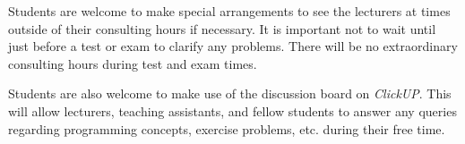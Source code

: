         Students are welcome to make special arrangements to see the lecturers
        at times outside of their consulting hours if necessary. It is
        important not to wait until just before a test or exam to clarify any
        problems. There will be no extraordinary consulting hours during test
        and exam times.

        Students are also welcome to make use of the discussion board on {\it
        ClickUP}. This will allow lecturers, teaching assistants, and fellow
        students to answer any queries regarding programming concepts, exercise
        problems, etc. during their free time.
